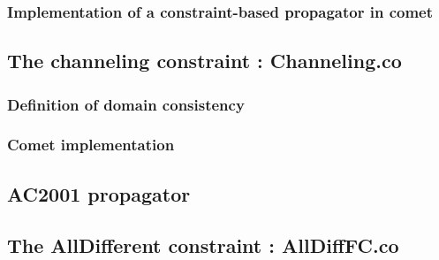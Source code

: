 \documentclass{eplDoc}
\begin{document}
\subsubsection{Implementation of a constraint-based propagator in comet}
\subsection{The channeling constraint : Channeling.co} %
\subsubsection{Definition of domain consistency}
\subsubsection{Comet implementation}

\subsection{AC2001 propagator} %


\subsection{The AllDifferent constraint : AllDiffFC.co} %
\end{document}
